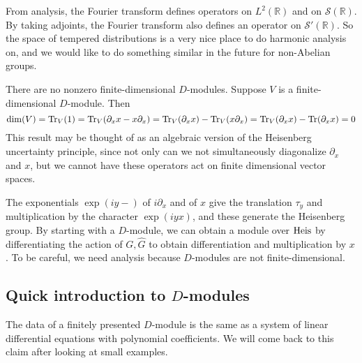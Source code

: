 \documentclass[../../rtnotes.tex]{subfiles}
\begin{document}
From analysis, the Fourier transform defines operators on $L^2(\mathbb R)$ and on $\mathcal S(\mathbb R)$. By taking adjoints, the Fourier transform also defines an operator on $\mathcal S'(\mathbb R)$. So the space of tempered distributions is a very nice place to do harmonic analysis on, and we would like to do something similar in the future for non-Abelian groups.

There are no nonzero finite-dimensional $D$-modules. Suppose $V$ is a finite-dimensional $D$-module. Then
\[\dim(V) = \Tr_V(1) = \Tr_V(\partial_xx-x\partial_x) = \Tr_V(\partial_xx)-\Tr_V(x\partial_x) = \Tr_V(\partial_xx)-\Tr(\partial_xx) = 0\]
This result may be thought of as an algebraic version of the Heisenberg uncertainty principle, since not only can we not simultaneously diagonalize $\partial_x$ and $x$, but we cannot have these operators act on finite dimensional vector spaces.

The exponentials $\exp(iy-)$ of $i\partial_x$ and of $x$ give the translation $\tau_{y}$ and multiplication by the character $\exp(iyx)$, and these generate the Heisenberg group. By starting with a $D$-module, we can obtain a module over $\operatorname{Heis}$ by differentiating the action of $G,\widehat G$ to obtain differentiation and multiplication by $x$. To be careful, we need analysis because $D$-modules are not finite-dimensional.

\subsection{Quick introduction to $D$-modules}
The data of a finitely presented $D$-module is the same as a system of linear differential equations with polynomial coefficients. We will come back to this claim after looking at small examples.
\end{document}
